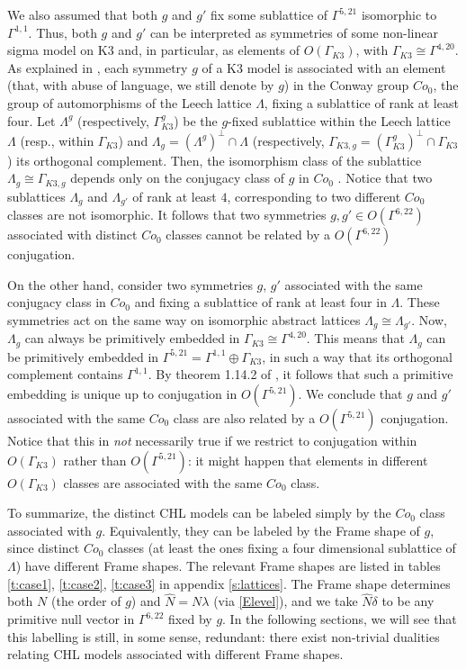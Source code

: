 \documentclass[a4paper,11pt]{article}
\numberwithin{equation}{section}
\begin{document}
We also assumed that both $g$ and $g'$ fix some sublattice of $\Gamma^{5,21}$ isomorphic to $\Gamma^{1,1}$. Thus, both $g$ and $g'$ can be interpreted as symmetries of some non-linear sigma model on K3 and, in particular, as elements of $O(\Gamma_{K3})$, with $\Gamma_{K3}\cong \Gamma^{4,20}$.  As explained in \cite{K3symm}, each symmetry $g$ of a K3 model is associated with an element (that, with abuse of language, we still denote by $g$) in the Conway group $Co_0$, the group of automorphisms of the Leech lattice $\Lambda$, fixing a sublattice of rank at least four. Let $\Lambda^g$ (respectively, $\Gamma_{K3}^g$) be the $g$-fixed sublattice within the Leech lattice $\Lambda$ (resp., within $\Gamma_{K3}$) and $\Lambda_g=(\Lambda^g)^\perp\cap \Lambda$  (respectively,  $\Gamma_{K3,g}=(\Gamma_{K3}^g)^\perp\cap \Gamma_{K3}$) its orthogonal complement. Then, the isomorphism class of the sublattice $\Lambda_g\cong \Gamma_{K3,g}$ depends only on the conjugacy class of $g$ in $Co_0$ \cite{K3symm}. Notice that two sublattices $\Lambda_g$ and $\Lambda_{g'}$ of rank at least $4$, corresponding to two different $Co_0$ classes are not isomorphic. It follows that two symmetries $g,g'\in O(\Gamma^{6,22})$ associated with distinct $Co_0$ classes cannot be related by a $O(\Gamma^{6,22})$ conjugation. 


On the other hand, consider two symmetries $g$, $g'$ associated with the same conjugacy class in $Co_0$ and fixing a sublattice of rank at least four in $\Lambda$. These symmetries act on the same way on isomorphic abstract lattices $\Lambda_g\cong \Lambda_{g'}$. Now, $\Lambda_g$ can always be primitively embedded in $\Gamma_{K3}\cong \Gamma^{4,20}$. This means that $\Lambda_g$ can be primitively embedded in $\Gamma^{5,21}=\Gamma^{1,1}\oplus \Gamma_{K3}$, in such a way that its orthogonal complement contains $\Gamma^{1,1}$. By theorem 1.14.2 of \cite{Nikulin}, it follows that such a primitive embedding is unique up to conjugation in $O(\Gamma^{5,21})$. We conclude that $g$ and $g'$ associated with the same $Co_0$ class are also related by a $O(\Gamma^{5,21})$ conjugation. Notice that this in \emph{not} necessarily true if we restrict to conjugation within $O(\Gamma_{K3})$ rather than $O(\Gamma^{5,21})$: it might happen that elements in different $O(\Gamma_{K3})$ classes are associated with the same $Co_0$ class. 

To summarize, the distinct CHL models can be labeled simply by the $Co_0$ class associated with $g$. Equivalently, they can be labeled by the Frame shape of $g$, since distinct $Co_0$ classes  (at least the ones fixing a four dimensional sublattice of $\Lambda$) have different Frame shapes. The relevant Frame shapes are listed in tables \ref{t:case1}, \ref{t:case2}, \ref{t:case3} in appendix \ref{s:lattices}. The Frame shape determines both $N$ (the order of $g$) and $\hat N=N\lambda$ (via \eqref{Elevel}), and we take $\hat N\delta$ to be any primitive null vector in $\Gamma^{6,22}$ fixed by $g$. In the following sections, we will see that  this labelling is still, in some sense, redundant: there exist non-trivial dualities relating CHL models associated with different Frame shapes.
\end{document}
